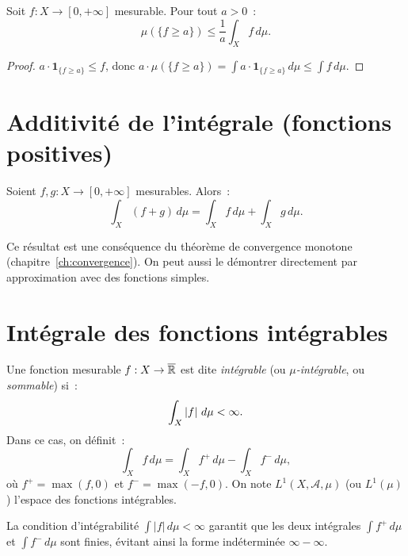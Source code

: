 \begin{theoreme}
\label{thm:markov}
Soit $f : X \to [0, +\infty]$ mesurable. Pour tout $a > 0$~:
\[
\mu(\{f \geq a\}) \leq \frac{1}{a} \int_X f\, d\mu.
\]
\end{theoreme}

\begin{proof}
$a \cdot \mathbf{1}_{\{f \geq a\}} \leq f$, donc
$a \cdot \mu(\{f \geq a\}) = \int a \cdot \mathbf{1}_{\{f \geq a\}}\, d\mu
\leq \int f\, d\mu$.
\end{proof}

\section{Additivit\'e de l'int\'egrale (fonctions positives)}

\begin{theoreme}
\label{thm:additivite_positive}
Soient $f, g : X \to [0, +\infty]$ mesurables. Alors~:
\[
\int_X (f + g)\, d\mu = \int_X f\, d\mu + \int_X g\, d\mu.
\]
\end{theoreme}

Ce r\'esultat est une cons\'equence du th\'eor\`eme de convergence monotone
(chapitre~\ref{ch:convergence}). On peut aussi le d\'emontrer directement par
approximation avec des fonctions simples.

\section{Int\'egrale des fonctions int\'egrables}

\begin{definition}
Une fonction mesurable $f : X \to \overline{\mathbb{R}}$ est dite \emph{int\'egrable}
(ou \emph{$\mu$-int\'egrable}, ou \emph{sommable}) si~:
\[
\int_X \left| f \right|\, d\mu < \infty.
\]
Dans ce cas, on d\'efinit~:
\[
\int_X f\, d\mu = \int_X f^+\, d\mu - \int_X f^-\, d\mu,
\]
o\`u $f^+ = \max(f, 0)$ et $f^- = \max(-f, 0)$. On note $L^1(X, \mathcal{A}, \mu)$
(ou $L^1(\mu)$) l'espace des fonctions int\'egrables.
\end{definition}

\begin{attention}[title=\textbf{La forme $\infty - \infty$ est interdite}]
La condition d'int\'egrabilit\'e $\int |f|\, d\mu < \infty$ garantit que les deux
int\'egrales $\int f^+\, d\mu$ et $\int f^-\, d\mu$ sont finies, \'evitant ainsi
la forme ind\'etermin\'ee $\infty - \infty$.
\end{attention}

